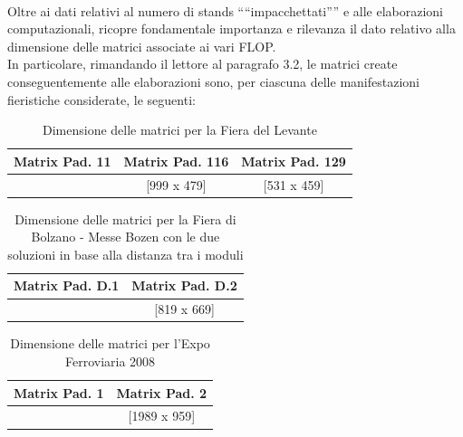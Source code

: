 \documentclass[12pt,a4paper,openright,twoside]{report}
\begin{document}
\\Oltre ai dati relativi al numero di stands "`"`impacchettati"'"' e alle elaborazioni computazionali, ricopre fondamentale importanza e rilevanza il dato relativo alla dimensione delle matrici associate ai vari FLOP.
\\In particolare, rimandando il lettore al paragrafo 3.2, le matrici create conseguentemente alle elaborazioni sono, per ciascuna delle manifestazioni fieristiche considerate, le seguenti:
\begin{table}[h]
\begin{center}
\begin{tabular}{|c|c|c|}
\hline
Matrix Pad. 11 & Matrix Pad. 116 & Matrix Pad. 129 \\
\hline
[799 x 699] & [999 x 479] & [531 x 459] \\
\hline
\end{tabular}
\end{center}
\caption{Dimensione delle matrici per la Fiera del Levante}
\label{tab:table}
\end{table} 
\begin{table}[h]
\begin{center}
\begin{tabular}{|c|c|}
\hline
Matrix Pad. D.1 & Matrix Pad. D.2 \\
\hline
[749 x 639] & [819 x 669] \\
\hline
\end{tabular}
\end{center}
\caption{Dimensione delle matrici per la Fiera di Bolzano - Messe Bozen con le due soluzioni in base alla distanza tra i moduli}
\label{tab:table}
\end{table} 
\begin{table}[h]
\begin{center}
\begin{tabular}{|c|c|}
\hline
Matrix Pad. 1 & Matrix Pad. 2 \\
\hline
[1529 x 539] & [1989 x 959] \\
\hline
\end{tabular}
\end{center}
\caption{Dimensione delle matrici per l'Expo Ferroviaria 2008}
\label{tab:table}
\end{table} 
\newpage
\end{document}
